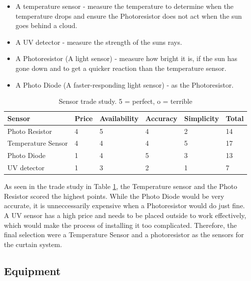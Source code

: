 \documentclass[a4paper,12pt]{article}
\begin{document}
\begin{itemize}
    \item A temperature sensor - measure the temperature to determine when the temperature drops and ensure the Photoresistor does not act when the sun goes behind a cloud.
    \item A UV detector - measure the strength of the suns rays.
    \item A Photoresistor (A light sensor) - measure how bright it is, if the sun has gone down and to get a quicker reaction than the temperature sensor.
    \item A Photo Diode (A faster-responding light sensor) - as the Photoresistor.
\end{itemize}

\begin{table}[h!]
    \caption{Sensor trade study. 5 = perfect, o = terrible}
    \begin{tabular}{l | l | l | l | l | l}
        Sensor & Price & Availability & Accuracy & Simplicity & Total\\
        \hline
        Photo Resistor & 4 & 5 & 4 & 2 & 14 \\
        Temperature Sensor & 4 & 4 & 4 & 5 & 17 \\
        Photo Diode & 1 & 4 & 5 & 3 & 13 \\
        UV detector & 1 & 3 & 2 & 1 & 7 \\

    \end{tabular}
    \label{tab:sensor}

\end{table}

As seen in the trade study in Table \ref{tab:sensor}, the Temperature sensor and the Photo Resistor scored the highest points. 
While the Photo Diode would be very accurate, it is unneccessarily expensive when a Photoresistor would do just fine. 
A UV sensor has a high price and needs to be placed outside to work effectively, which would make the process of installing it too complicated. 
Therefore, the final selection were a Temperature Sensor and a photoresistor as the sensors for the curtain system.

\subsection{Equipment}                                                                                                                                                                                                                                                                                                                                                                                                                                                                                                                                                              
\end{document}
